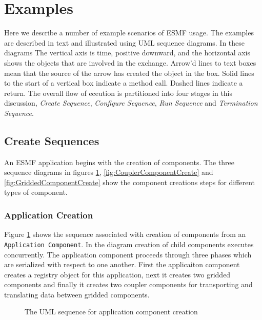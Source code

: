 \section{Examples}

Here we describe a number of example scenarios of ESMF usage. The examples are
described in text and illustrated using UML sequence diagrams. In these diagrams
The vertical axis is time, positive
downward, and the horizontal axis shows the objects that are involved in the
exchange.  Arrow'd lines to text boxes mean that the source of the arrow has
created the object in the box.  Solid lines to the start of a vertical
box indicate a method call.  Dashed lines indicate a return.
The overall flow of eceution is partitioned into four stages in this
discussion, {\it Create Sequence}, {\it Configure Sequence}, {\it Run Sequence}
and {\it Termination Sequence}.
 
\subsection{Create Sequences}

An ESMF application begins with the creation of components. The
three sequence diagrams in figures \ref{fig:ApplicationComponentCreate}, 
\ref{fig:CouplerComponentCreate} and 
\ref{fig:GriddedComponentCreate} show the
component creations steps for different types of component.


\subsubsection{Application Creation}
Figure \ref{fig:ApplicationComponentCreate} shows the sequence associated with
creation of components from an {\tt Application Component}. In the diagram
creation of child components executes concurrently. The application component
proceeds through three phases which are serialized with respect to one another.
First the applicaiton component creates a registry object for this application,
next it creates two gridded components and finally it creates two coupler
components for transporting and translating data between gridded components.
\begin{figure}
\caption[{Application Component Create}]
{The UML sequence for application component creation}
\label{fig:ApplicationComponentCreate}
\end{figure}

